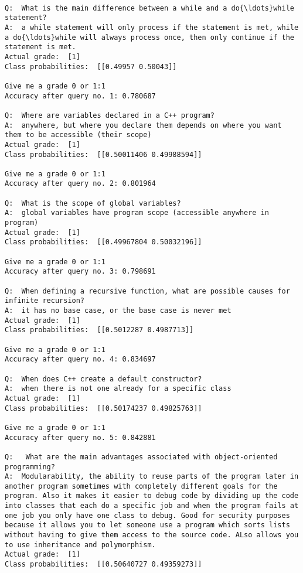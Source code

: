 \documentclass[11pt]{article}
\begin{document}
    \begin{Verbatim}[commandchars=\\\{\}]

Q:  What is the main difference between a while and a do{\ldots}while statement?
A:  a while statement will only process if the statement is met, while a do{\ldots}while will always process once, then only continue if the statement is met.
Actual grade:  [1]
Class probabilities:  [[0.49957 0.50043]]

Give me a grade 0 or 1:1
Accuracy after query no. 1: 0.780687

Q:  Where are variables declared in a C++ program?
A:  anywhere, but where you declare them depends on where you want them to be accessible (their scope)
Actual grade:  [1]
Class probabilities:  [[0.50011406 0.49988594]]

Give me a grade 0 or 1:1
Accuracy after query no. 2: 0.801964

Q:  What is the scope of global variables?
A:  global variables have program scope (accessible anywhere in program)
Actual grade:  [1]
Class probabilities:  [[0.49967804 0.50032196]]

Give me a grade 0 or 1:1
Accuracy after query no. 3: 0.798691

Q:  When defining a recursive function, what are possible causes for infinite recursion?
A:  it has no base case, or the base case is never met
Actual grade:  [1]
Class probabilities:  [[0.5012287 0.4987713]]

Give me a grade 0 or 1:1
Accuracy after query no. 4: 0.834697

Q:  When does C++ create a default constructor?
A:  when there is not one already for a specific class
Actual grade:  [1]
Class probabilities:  [[0.50174237 0.49825763]]

Give me a grade 0 or 1:1
Accuracy after query no. 5: 0.842881

Q:   What are the main advantages associated with object-oriented programming?
A:  Modularability, the ability to reuse parts of the program later in another program sometimes with completely different goals for the program. Also it makes it easier to debug code by dividing up the code into classes that each do a specific job and when the program fails at one job you only have one class to debug. Good for security purposes because it allows you to let someone use a program which sorts lists without having to give them access to the source code. ALso allows you to use inheritance and polymorphism.
Actual grade:  [1]
Class probabilities:  [[0.50640727 0.49359273]]


\end{Verbatim}
\end{document}
